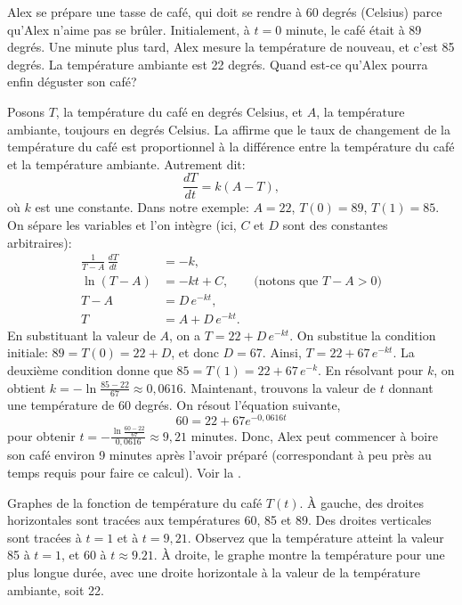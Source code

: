 \begin{example} \label{sep:coffeeexample}
	Alex se prépare une tasse de café, qui doit se rendre à 60 degrés (Celsius) parce qu'Alex n'aime pas se brûler.
	Initialement, à $t=0$ minute,
	le café était à 89 degrés.  Une minute plus tard, Alex mesure la température de nouveau, et c'est 85 degrés.
	La température ambiante est 22 degrés.  Quand est-ce qu'Alex pourra enfin déguster son café?

	Posons $T$, la température du café en degrés Celsius, et $A$, la température ambiante, toujours en degrés Celsius.
	La 	 affirme que le taux de changement de la température du café est
	proportionnel à la différence entre la température du café et la température ambiante.  Autrement dit:
	\begin{equation*}
		\frac{dT}{dt} = k(A-T),
	\end{equation*}
	où $k$ est une constante.
	Dans notre exemple: $A=22$, $T(0) = 89$, $T(1) = 85$.
	On sépare les variables et l'on intègre (ici, $C$ et $D$ sont des constantes arbitraires):
	\begin{align*}
		\frac{1}{T-A} \, \frac{dT}{dt} & = -k , \\
							\ln (T-A)  &= -kt + C , \qquad \text{(notons que } T-A > 0 \text{)} \\
								T-A    &= D\, e^{-kt} ,  \\
								T      &= A + D\, e^{-kt} .
	\end{align*}
	En substituant la valeur de $A$, on a
	$T = 22 + D\, e^{-kt}$.
	On substitue la condition initiale: $89 = T(0) = 22 + D$,
	et donc $D = 67$.
	Ainsi,  $T = 22 + 67\, e^{-kt}$.
	La deuxième condition donne que $85 = T(1) = 22 + 67\, e^{-k}$.
	En résolvant pour $k$, on obtient 	$k = - \ln \frac{85-22}{67} \approx 0,0616$.
	Maintenant, trouvons la valeur de $t$ donnant une température de 60 degrés.
	On résout l'équation suivante,
	\begin{equation*}
		60 = 22 + 67 e^{-0,0616t}
	\end{equation*}
	pour obtenir
	$t = - \frac{\ln \frac{60-22}{67}}{0,0616} \approx 9,21$ minutes.
	Donc, Alex peut commencer à boire son café environ 9 minutes après l'avoir préparé (correspondant à peu près au temps requis pour faire ce calcul).  Voir la .
	\begin{myfig}
		\capstart		{}
		\caption{Graphes de la fonction de température du café $T(t)$.
		À gauche, des droites horizontales sont tracées aux températures 60, 85 et 89.
		Des droites verticales sont tracées à $t=1$ et à $t=9,21$.
		Observez que la température atteint la valeur 85 à $t=1$, et 60 à
		$t \approx 9.21$.  À droite, le graphe montre la température pour une plus longue durée,
		avec une droite horizontale à la valeur de la température ambiante, soit 22.\label{sintro:coffeefig}}
	\end{myfig}
\end{example}

